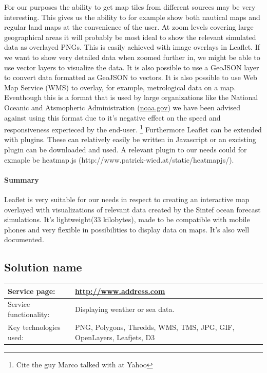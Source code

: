 \documentclass[11pt,a4paper,titlepage,oneside]{report}
\begin{document}
  For our purposes the ability to get map tiles from different sources may be very interesting. This gives us the ability to for example show both nautical maps and regular land maps at the convenience of the user. At zoom levels covering large geographical areas it will probably be most ideal to show the relevant simulated data as overlayed PNGs. This is easily achieved with image overlays in Leaflet. If we want to show very detailed data when zoomed further in, we might be able to use vector layers to visualize the data. It is also possible to use a GeoJSON layer to convert data formatted as GeoJSON to vectors.
  It is also possible to use Web Map Service (WMS) to overlay, for example, metrological data on a map. Eventhough this is a format that is used by large organizations like the National Oceanic and Atsmopheric Administration (\url{noaa.gov}) we have been advised against using this format due to it's negative effect on the speed and responsiveness experieced by the end-user. \footnote{Cite the guy Marco talked with at Yahoo}
  Furthermore Leaflet can be extended with plugins. These can relatively easily be written in Javascript or an excisting plugin can be downloaded and used. A relevant plugin to our needs could for exmaple be heatmap.js (http://www.patrick-wied.at/static/heatmapjs/).

  \paragraph{Summary}
  Leaflet is very suitable for our needs in respect to creating an interactive map overlayed with visualizations of relevant data created by the Sintef ocean forecast simulations. It's lightweight(33 kilobytes), made to be compatible with mobile phones and very flexible in possibilities to display data on maps. It's also well documented.


\subsection{Solution name}
\begin{tabular}{|p{4cm}|p{8cm}|}

\hline
Service page: & \url{http://www.address.com} \\%
\hline
Service functionality: & Displaying weather or sea data. \\
\hline
Key technologies used: & PNG, Polygons, Thredds, WMS, TMS, JPG, GIF, OpenLayers, Leafjets, D3 \\
\hline
\end{tabular}
\end{document}
